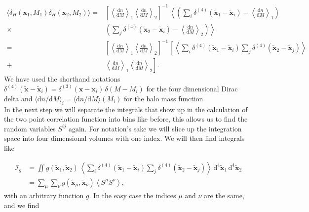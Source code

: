 \documentclass[oneside]{book}
\newcommand*{\rd}{\mathrm{d}}
\begin{document}
\begin{align}
    \label{eq:two-point-halo-seed-denstiy-correlation}
    \langle \delta_H(\boldsymbol{x}_1,M_1) \delta_H(\boldsymbol{x}_2,M_2) \rangle =& \left[\left\langle  \frac{\rd n}{\rd M} \right\rangle_1\left\langle  \frac{\rd n}{\rd M} \right\rangle_2\right]^{-1}\,\left\langle\left(\sum_i \delta^{(4)}(\tilde{\boldsymbol{x}}_1-\tilde{\boldsymbol{x}}_i) - \left\langle  \frac{\rd n}{\rd M} \right\rangle_1\right) \right. \\
\times& \left.\left(\sum_j \delta^{(4)}(\tilde{\boldsymbol{x}}_2-\tilde{\boldsymbol{x}}_i) - \left\langle  \frac{\rd n}{\rd M} \right\rangle_2\right) \right\rangle \nonumber\\
=& \left[\left\langle  \frac{\rd n}{\rd M} \right\rangle_1\left\langle  \frac{\rd n}{\rd M} \right\rangle_2\right]^{-1}\,\left[\left\langle\sum_i \delta^{(4)}(\tilde{\boldsymbol{x}}_1-\tilde{\boldsymbol{x}}_i)\sum_j \delta^{(4)}(\tilde{\boldsymbol{x}}_2-\tilde{\boldsymbol{x}}_j)\right\rangle \right. \\
+&\left. \left\langle  \frac{\rd n}{\rd M} \right\rangle_1\left\langle  \frac{\rd n}{\rd M} \right\rangle_2\right]. \nonumber
\end{align}
We have used the shorthand notations $\delta^{(4)}(\tilde{\boldsymbol{x}}-\tilde{\boldsymbol{x}}_i) = \delta^{(3)}({\boldsymbol{x}}-{\boldsymbol{x}}_i)\,\delta(M-M_i)$ for the four dimensional Dirac delta and $\langle {\rd n}/{\rd M} \rangle_i = \langle  {\rd n}/{\rd M}\rangle(M_i)$ for the halo mass function.\\
In the next step we will separate the integrals that show up in the calculation of the two point correlation function into bins like before, this allows us to find the random variables $S^{ij}$ again. For notation's sake we will slice up the integration space into four dimensional volumes with one index. We will then find integrals like

\begin{align}
    \mathcal{I}_g &= \iint g(\tilde{\boldsymbol{x}}_1,\tilde{\boldsymbol{x}}_2)\,\left\langle\sum_i \delta^{(4)}(\tilde{\boldsymbol{x}}_1-\tilde{\boldsymbol{x}}_i)\sum_j \delta^{(4)}(\tilde{\boldsymbol{x}}_2-\tilde{\boldsymbol{x}}_j)\right\rangle\, \rd^4\tilde{\boldsymbol{x}}_1 \, \rd^4\tilde{\boldsymbol{x}}_2 \label{eq:start_derivation_dirac}\\
                &= \sum_\mu \sum_\nu g(\tilde{\boldsymbol{x}}_\mu,\tilde{\boldsymbol{x}}_\nu) \left\langle S^\mu S^\nu \right\rangle,
\end{align} 
with an arbitrary function $g$. In the easy case the indices $\mu$ and $\nu$ are the same, and we find 
\end{document}
